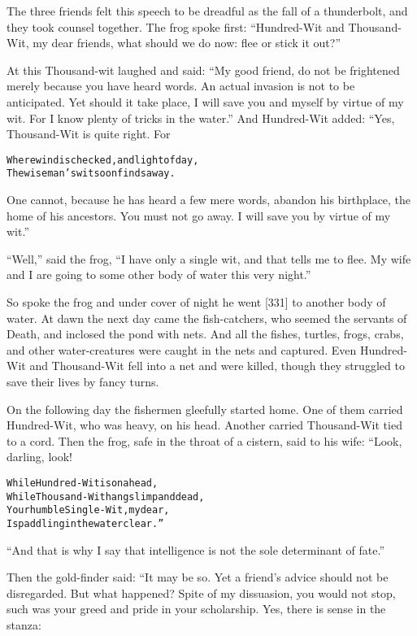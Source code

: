 \documentclass{article}
\renewenvironment{verbatim}{\begin{alltt}\normalfont\begin{centering}}{\end{centering}\end{alltt}}
\begin{document}
The three friends felt this speech to be dreadful as the fall of a
thunderbolt, and they took counsel together. The frog spoke first:
``Hundred-Wit and Thousand-Wit, my dear friends, what should we do now: flee or stick it out?''

At this Thousand-wit laughed and said:
``My good friend, do not be frightened merely because you have heard words. An actual invasion is not to be anticipated. Yet should it take place, I will save you and myself by virtue of my wit. For I know plenty of tricks in the water.''
And Hundred-Wit added: “Yes, Thousand-Wit is quite right. For

\begin{verbatim}
Where wind is checked, and light of day,
The wise man's wit soon finds a way.
\end{verbatim}
One cannot, because he has heard a few mere words, abandon his
birthplace, the home of his ancestors. You must not go away. I will
save you by virtue of my wit.”

``Well,'' said the frog,
``I have only a single wit, and that tells me to flee. My wife and I are going to some other body of water this very night.''

So spoke the frog and under cover of night he went [331] to another
body of water. At dawn the next day came the fish-catchers, who
seemed the servants of Death, and inclosed the pond with nets. And
all the fishes, turtles, frogs, crabs, and other water-creatures
were caught in the nets and captured. Even Hundred-Wit and
Thousand-Wit fell into a net and were killed, though they struggled
to save their lives by fancy turns.

On the following day the fishermen gleefully started home. One of
them carried Hundred-Wit, who was heavy, on his head. Another
carried Thousand-Wit tied to a cord. Then the frog, safe in the
throat of a cistern, said to his wife: “Look, darling, look!

\begin{verbatim}
While Hundred-Wit is on a head,
While Thousand-Wit hangs limp and dead,
Your humble Single-Wit, my dear,
Is paddling in the water clear.”                        
\end{verbatim}
``And that is why I say that intelligence is not the sole determinant of fate.''

Then the gold-finder said: “It may be so. Yet a friend's advice
should not be disregarded. But what happened? Spite of my
dissuasion, you would not stop, such was your greed and pride in
your scholarship. Yes, there is sense in the stanza:
\end{document}
